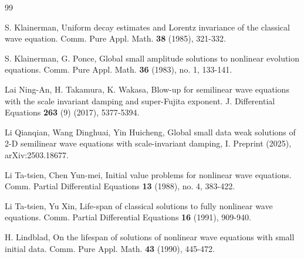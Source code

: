 \documentclass[11pt,twoside]{article}
\theoremstyle{plain}
\theoremstyle{definition}
\theoremstyle{remark}
\numberwithin{equation}{section}
\begin{document}
\begin{thebibliography}{99}





S. Klainerman, Uniform decay estimates and Lorentz invariance of the classical wave equation. Comm. Pure Appl.
Math. \textbf{38} (1985), 321-332.



 S. Klainerman, G. Ponce,  Global small amplitude solutions to nonlinear evolution equations.
Comm. Pure Appl. Math. \textbf{36} (1983), no. 1, 133-141.








Lai Ning-An, H. Takamura, K. Wakasa, Blow-up for semilinear wave equations with the scale invariant damping and super-Fujita exponent.
J. Differential Equations \textbf{263} (9) (2017), 5377-5394.



 Li Qianqian, Wang Dinghuai, Yin Huicheng,
Global small data weak solutions of 2-D semilinear wave equations
with  scale-invariant  damping, I.  Preprint (2025), arXiv:2503.18677.


 Li Ta-tsien, Chen Yun-mei,
Initial value problems for nonlinear wave equations.
Comm. Partial Differential Equations \textbf{13} (1988), no. 4, 383-422.





Li Ta-tsien, Yu Xin, Life-span of classical solutions to fully nonlinear wave equations.
Comm. Partial Differential Equations \textbf{16} (1991), 909-940.


 H. Lindblad, On the lifespan of solutions of nonlinear wave equations with small initial data.
Comm. Pure Appl. Math. \textbf{43}  (1990), 445-472.



\end{thebibliography}
\end{document}
